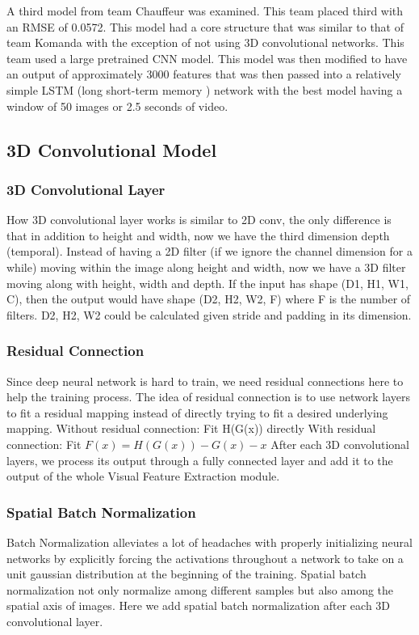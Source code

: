 \documentclass[10pt,twocolumn,letterpaper]{article}
\begin{document}
A third model from team Chauffeur was examined. This team placed third with an RMSE of 0.0572. This model had a core structure that was similar to that of team Komanda with the exception of not using 3D convolutional networks. This team used a large pretrained CNN model. This model was then modified to have an output of approximately 3000 features that was then passed into a relatively simple LSTM (long short-term memory \cite{hochreiter1997long}) network with the best model having a window of 50 images or 2.5 seconds of video.

\subsection{3D Convolutional Model}

\subsubsection*{3D Convolutional Layer}
How 3D convolutional layer works is similar to 2D conv, the only difference is that in addition to height and width, now we have the third dimension depth (temporal). Instead of having a 2D filter (if we ignore the channel dimension for a while) moving within the image along height and width, now we have a 3D filter moving along with height, width and depth. If the input has shape (D1, H1,  W1, C), then the output would have shape (D2, H2, W2, F) where F is the number of filters. D2, H2, W2 could be calculated given stride and padding in its dimension.

\subsubsection*{Residual Connection}
Since deep neural network is hard to train, we need residual connections here to help the training process. The idea of residual connection is to use network layers to fit a residual mapping instead of directly trying to fit a desired underlying mapping. 
Without residual connection:
Fit H(G(x)) directly
With residual connection:
Fit $F(x)=H(G(x))-G(x)-x$
After each 3D convolutional layers, we process its output through a fully connected layer and add it to the output of the whole Visual Feature Extraction module.

\subsubsection*{Spatial Batch Normalization}
Batch Normalization alleviates a lot of headaches with properly initializing neural networks by explicitly forcing the activations throughout a network to take on a unit gaussian distribution at the beginning of the training. Spatial batch normalization not only normalize among different samples but also among the spatial axis of images. Here we add spatial batch normalization after each 3D convolutional layer.
\end{document}
